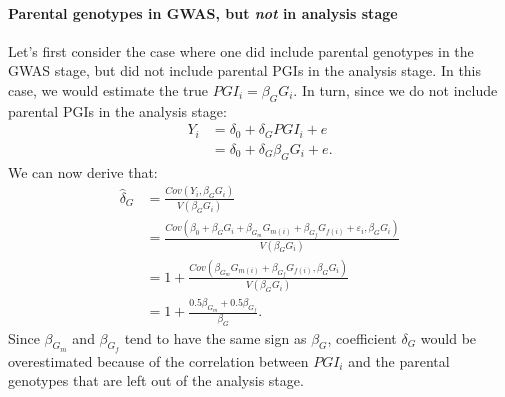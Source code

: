 \documentclass[12pt,a4paper]{article}
\begin{document}
\begin{bibunit}
\paragraph{Parental genotypes in GWAS, but \textit{not} in analysis stage}
Let's first consider the case where one did include parental genotypes in the GWAS stage, but did not include parental PGIs in the analysis stage. In this case, we would estimate the true $PGI_i = \beta_G G_i$. In turn, since we do not include parental PGIs in the analysis stage:
\begin{align} 
 Y_i &= \delta_0 + \delta_G PGI_i + e \nonumber\\
  &= \delta_0 + \delta_G \beta_G G_i + e.
\end{align}
We can now derive that:
\begin{align}
 \hat{\delta}_G &= \frac{Cov(Y_i,\beta_G G_i)}{V(\beta_G G_i)} \nonumber\\
 &= \frac{Cov(\beta_0 + \beta_{G} G_i + \beta_{G_m} G_{m(i)} + \beta_{G_f} G_{f(i)} + \varepsilon_i,\beta_G G_i)}{V(\beta_G G_i)} \nonumber\\
 &= 1 + \frac{Cov(\beta_{G_m} G_{m(i)} + \beta_{G_f} G_{f(i)},\beta_G G_i)}{V(\beta_G G_i)} \nonumber\\
 &= 1 + \frac{0.5 \beta_{G_m} + 0.5 \beta_{G_f}}{\beta_G}.
\end{align}
Since $\beta_{G_m}$ and $\beta_{G_f}$ tend to have the same sign as $\beta_G$, coefficient $\delta_G$ would be overestimated because of the correlation between $PGI_i$ and the parental genotypes that are left out of the analysis stage. 


\end{bibunit}
\end{document}
